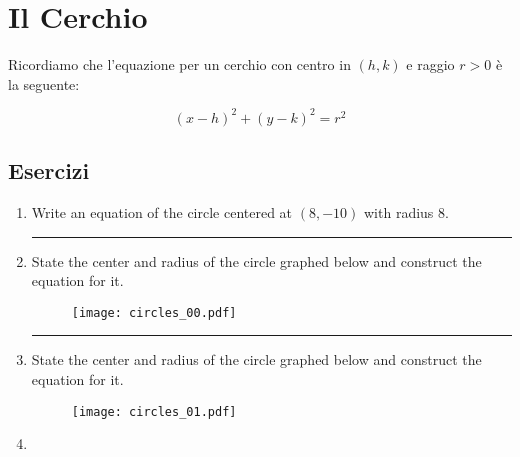 \section{Il Cerchio}\label{subsec:the:circle}

Ricordiamo che l'equazione per un cerchio con centro in $(h,k)$ e raggio $r>0$ è la seguente: 

\begin{equation} \label{cerchio:equazione}
(x-h)^2+(y-k)^2=r^2
\end{equation}

\subsection{Esercizi}

\begin{enumerate}

\item  \label{circ_00}
Write an equation of the circle centered at $(8 , -10)$ with radius $8$.

\vspace{1cm}
\hrule
\vspace{1cm}


\item  \label{circ_01}

State the center and radius of the circle graphed below and construct the equation for it.

\begin{figure}[H]
\centering
\texttt{[image: circles\_00.pdf]}
\end{figure}



\vspace{1cm}
\hrule
\vspace{1cm}

\item  \label{circ_02}

State the center and radius of the circle graphed below and construct the equation for it.

\begin{figure}[H]
\centering
\texttt{[image: circles\_01.pdf]}
\end{figure}



\item  \label{circ_03}


\end{enumerate}
